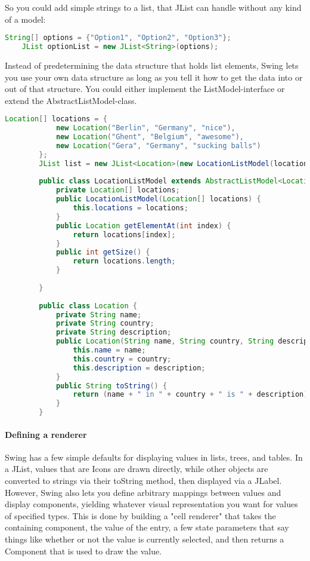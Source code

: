  So you could add simple strings to a list, that JList can handle without any kind of a model:
 
 \begin{lstlisting}[language=java]
    String[] options = {"Option1", "Option2", "Option3"};
    JList optionList = new JList<String>(options);
 \end{lstlisting}
 
Instead of predetermining the data structure that holds list elements, Swing lets you use your own data structure as long as you tell it how to get the data into or out of that structure. You could either implement the ListModel-interface or extend the AbstractListModel-class.
 
 \begin{lstlisting}[language=java]
        Location[] locations = {
			new Location("Berlin", "Germany", "nice"),
			new Location("Ghent", "Belgium", "awesome"),
			new Location("Gera", "Germany", "sucking balls")
		};
		JList list = new JList<Location>(new LocationListModel(locations));
		
		public class LocationListModel extends AbstractListModel<Location>{
        	private Location[] locations;
        	public LocationListModel(Location[] locations) {
        		this.locations = locations;
        	}
        	public Location getElementAt(int index) {
        		return locations[index];
        	}
        	public int getSize() {
        		return locations.length;
        	}
        
        }
        
        public class Location {
        	private String name;
        	private String country;
        	private String description;
        	public Location(String name, String country, String description) {
        		this.name = name;
        		this.country = country;
        		this.description = description;
        	}
        	public String toString() {
        		return (name + " in " + country + " is " + description);
        	}
        }
 \end{lstlisting}
 
 \paragraph{Defining a renderer} Swing has a few simple defaults for displaying values in lists, trees, and tables. In a JList, values that are Icons are drawn directly, while other objects are converted to strings via their toString method, then displayed via a JLabel. However, Swing also lets you define arbitrary mappings between values and display components, yielding whatever visual representation you want for values of specified types. This is done by building a "cell renderer" that takes the containing component, the value of the entry, a few state parameters that say things like whether or not the value is currently selected, and then returns a Component that is used to draw the value. 
 
